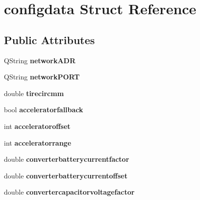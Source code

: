 \hypertarget{structconfigdata}{}\section{configdata Struct Reference}
\label{structconfigdata}
\subsection*{Public Attributes}
\begin{DoxyCompactItemize}
\item 
\hypertarget{structconfigdata_a7f2c2496dbe8aaa99be65339913ae491}{}Q\+String {\bfseries network\+A\+D\+R}\label{structconfigdata_a7f2c2496dbe8aaa99be65339913ae491}

\item 
\hypertarget{structconfigdata_a9b84b69f0c433960bcda891ce5116809}{}Q\+String {\bfseries network\+P\+O\+R\+T}\label{structconfigdata_a9b84b69f0c433960bcda891ce5116809}

\item 
\hypertarget{structconfigdata_a95a130edc0a759ce4342cfccf095410b}{}double {\bfseries tirecircmm}\label{structconfigdata_a95a130edc0a759ce4342cfccf095410b}

\item 
\hypertarget{structconfigdata_aaae8c209cea7772f5427d91b96906769}{}bool {\bfseries acceleratorfallback}\label{structconfigdata_aaae8c209cea7772f5427d91b96906769}

\item 
\hypertarget{structconfigdata_a227278a6ac10a6ad498439f49b3ffb46}{}int {\bfseries acceleratoroffset}\label{structconfigdata_a227278a6ac10a6ad498439f49b3ffb46}

\item 
\hypertarget{structconfigdata_ae518af6c53f99cae431ccded0e2c567a}{}int {\bfseries acceleratorrange}\label{structconfigdata_ae518af6c53f99cae431ccded0e2c567a}

\item 
\hypertarget{structconfigdata_a69b2997ab4e609b2d39613255fd047c5}{}double {\bfseries converterbatterycurrentfactor}\label{structconfigdata_a69b2997ab4e609b2d39613255fd047c5}

\item 
\hypertarget{structconfigdata_a7cfa5f850c0d38e77ca0f1639b2b98df}{}double {\bfseries converterbatterycurrentoffset}\label{structconfigdata_a7cfa5f850c0d38e77ca0f1639b2b98df}

\item 
\hypertarget{structconfigdata_a38be7523e30ae5a5b9ed52138007bb87}{}double {\bfseries convertercapacitorvoltagefactor}\label{structconfigdata_a38be7523e30ae5a5b9ed52138007bb87}


\end{DoxyCompactItemize}
